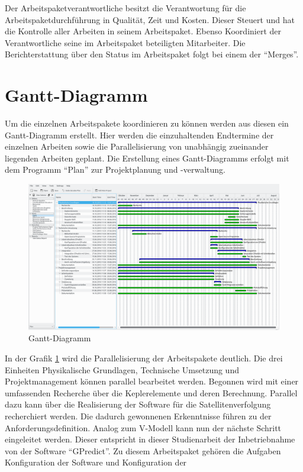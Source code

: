 Der Arbeitspaketverantwortliche besitzt die Verantwortung für die Arbeitspaketdurchführung in 
Qualität, Zeit und Kosten. Dieser Steuert und hat die Kontrolle aller Arbeiten in seinem 
Arbeitspaket. Ebenso Koordiniert der Verantwortliche seine im Arbeitspaket beteiligten Mitarbeiter. 
Die Berichterstattung über den Status im Arbeitspaket folgt bei einem der ``Merges''.
\newpar

\section{Gantt-Diagramm}
Um die einzelnen Arbeitspakete koordinieren zu können werden aus diesen ein Gantt-Diagramm 
erstellt. Hier werden die einzuhaltenden Endtermine der einzelnen Arbeiten sowie die 
Parallelisierung von unabhängig zueinander liegenden Arbeiten geplant. Die Erstellung eines Gantt-Diagramms erfolgt mit dem Programm ``Plan'' zur 
Projektplanung und -verwaltung. 
\begin{figure}[h] 
 \centering
\includegraphics[width=1.0\linewidth]{./images/gantt}
\caption{Gantt-Diagramm}
 \label{fig:gantt}
\end{figure}
In der Grafik \ref{fig:gantt} wird die Parallelisierung der Arbeitspakete deutlich. Die drei Einheiten Physikalische Grundlagen, Technische Umsetzung 
und Projektmanagement können parallel bearbeitet werden. Begonnen wird mit einer umfassenden Recherche über die Keplerelemente und deren Berechnung. 
Parallel dazu kann über die  Realisierung der Software für die Satellitenverfolgung recherchiert werden. Die dadurch gewonnenen Erkenntnisse führen 
zu der Anforderungsdefinition. Analog zum V-Modell kann nun der nächste Schritt eingeleitet werden. Dieser entspricht in dieser Studienarbeit der 
Inbetriebnahme von der Software ``GPredict''. Zu diesem Arbeitspaket gehören die Aufgaben Konfiguration der Software und Konfiguration der 
